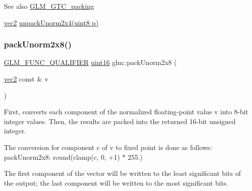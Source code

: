 \begin{DoxySeeAlso}{See also}
\hyperlink{group__gtc__packing}{G\+L\+M\+\_\+\+G\+T\+C\+\_\+packing} 

\hyperlink{group__core__types_gaa1618f51db67eaa145db101d8c8431d8}{vec2} \hyperlink{group__gtc__packing_ga3afb0452954320f2d83fe6f38cb24147}{unpack\+Unorm2x4(uint8 p)} 
\end{DoxySeeAlso}
\mbox{\label{group__gtc__packing_ga833288fc0d4a79f19d0db75a6843bfe6}} 
\subsubsection{\texorpdfstring{pack\+Unorm2x8()}{packUnorm2x8()}}
{\footnotesize\ttfamily \hyperlink{setup_8hpp_a33fdea6f91c5f834105f7415e2a64407}{G\+L\+M\+\_\+\+F\+U\+N\+C\+\_\+\+Q\+U\+A\+L\+I\+F\+I\+ER} \hyperlink{group__gtc__type__precision_gad8c2939e1fdd8e5828b31d95c52255d5}{uint16} glm\+::pack\+Unorm2x8 (\begin{DoxyParamCaption}\item[{\hyperlink{group__core__types_gaa1618f51db67eaa145db101d8c8431d8}{vec2} const \&}]{v }\end{DoxyParamCaption})}

First, converts each component of the normalized floating-\/point value v into 8-\/bit integer values. Then, the results are packed into the returned 16-\/bit unsigned integer.

The conversion for component c of v to fixed point is done as follows\+: pack\+Unorm2x8\+: round(clamp(c, 0, +1) $\ast$ 255.)

The first component of the vector will be written to the least significant bits of the output; the last component will be written to the most significant bits.

